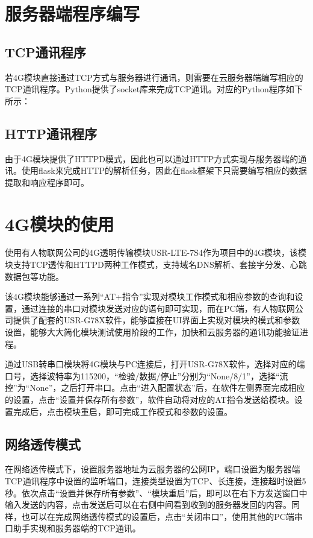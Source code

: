 \documentclass[a4paper,11pt]{ctexart}
\begin{document}
\begin{spacing}{1.5}
\section{服务器端程序编写}
\subsection{TCP通讯程序}
\par
若4G模块直接通过TCP方式与服务器进行通讯，则需要在云服务器端编写相应的TCP通讯程序。Python提供了socket库来完成TCP通讯。对应的Python程序如下所示：
\subsection{HTTP通讯程序}
\par
由于4G模块提供了HTTPD模式，因此也可以通过HTTP方式实现与服务器端的通讯。使用flask来完成HTTP的解析任务，因此在flask框架下只需要编写相应的数据提取和响应程序即可。



\section{4G模块的使用}
\par
使用有人物联网公司的4G透明传输模块USR-LTE-7S4作为项目中的4G模块，该模块支持TCP透传和HTTPD两种工作模式，支持域名DNS解析、套接字分发、心跳数据包等功能。
\par
该4G模块能够通过一系列“AT+指令”实现对模块工作模式和相应参数的查询和设置，通过连接的串口对模块发送对应的语句即可实现，而在PC端，有人物联网公司提供了配套的USR-G78X软件，能够直接在UI界面上实现对模块的模式和参数设置，能够大大简化模块测试使用阶段的工作，加快和云服务器的通讯功能验证进程。
\par
通过USB转串口模块将4G模块与PC连接后，打开USR-G78X软件，选择对应的端口号，选择波特率为115200，“检验/数据/停止”分别为“None/8/1”，选择“流控”为“None”，之后打开串口。点击“进入配置状态”后，在软件左侧界面完成相应的设置，点击“设置并保存所有参数”，软件自动将对应的AT指令发送给模块。设置完成后，点击模块重启，即可完成工作模式和参数的设置。
\subsection{网络透传模式}
\par
在网络透传模式下，设置服务器地址为云服务器的公网IP，端口设置为服务器端TCP通讯程序中设置的监听端口，连接类型设置为TCP、长连接，连接超时设置5秒。依次点击“设置并保存所有参数”、“模块重启”后，即可以在右下方发送窗口中输入发送的内容，点击发送后可以在右侧中间看到收到的服务器发回的内容。同样，也可以在完成网络透传模式的设置后，点击“关闭串口”，使用其他的PC端串口助手实现和服务器端的TCP通讯。

\end{spacing}
\end{document}
